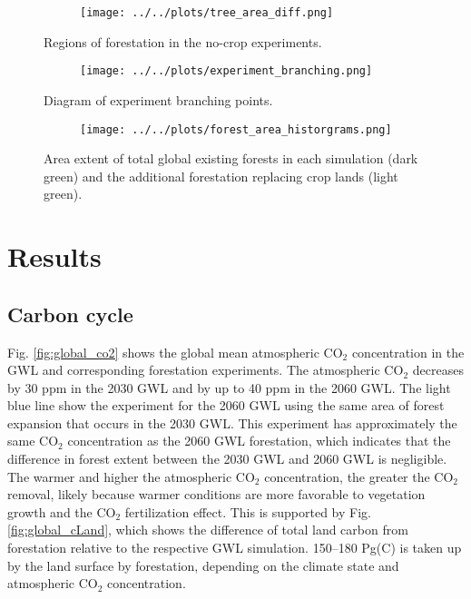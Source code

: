 \documentclass[]{article}
\begin{document}
\begin{figure}[H]
    \centering
    \begin{subfigure}[b]{\linewidth}
        \texttt{[image: ../../plots/tree\_area\_diff.png]}
    \end{subfigure}
    \caption{Regions of forestation in the no-crop experiments.}
    \label{fig:forestation_on_crops}
\end{figure}

\begin{figure}[H]
    \centering
    \begin{subfigure}[b]{\linewidth}
        \texttt{[image: ../../plots/experiment\_branching.png]}
    \end{subfigure}
    \caption{Diagram of experiment branching points.}
    \label{fig:experiment_branching}
\end{figure}

\begin{figure}[H]
    \centering
    \begin{subfigure}[b]{\linewidth}
        \texttt{[image: ../../plots/forest\_area\_historgrams.png]}
    \end{subfigure}
    \caption{Area extent of total global existing forests in each simulation (dark green) and the additional forestation replacing crop lands (light green).}
    \label{fig:forestation_ammount}
\end{figure}

\section{Results}

\subsection{Carbon cycle}

Fig. \ref{fig:global_co2} shows the global mean atmospheric CO$_2$ concentration in the GWL and corresponding forestation experiments.
The atmospheric CO$_2$ decreases by 30 ppm in the 2030 GWL and by up to 40 ppm in the 2060 GWL.
The light blue line show the experiment for the 2060 GWL using the same area of forest expansion that occurs in the 2030 GWL. This experiment has approximately the same CO$_2$ concentration as the 2060 GWL forestation, which indicates that the difference in forest extent between the 2030 GWL and 2060 GWL is negligible.
The warmer and higher the atmospheric CO$_2$ concentration, the greater the CO$_2$ removal, likely because warmer conditions are more favorable to vegetation growth and the CO$_2$ fertilization effect.
This is supported by Fig. \ref{fig:global_cLand}, which shows the difference of total land carbon from forestation relative to the respective GWL simulation.
150–180 Pg(C) is taken up by the land surface by forestation, depending on the climate state and atmospheric CO$_2$ concentration.
\end{document}
